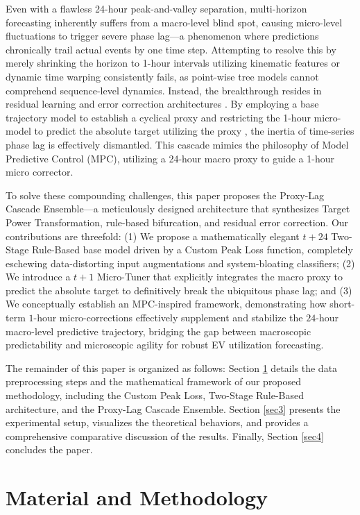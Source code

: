 \documentclass[pdflatex,sn-mathphys-num]{sn-jnl}%
\theoremstyle{thmstyleone}%
\theoremstyle{thmstyletwo}%
\theoremstyle{thmstylethree}%
\begin{document}
Even with a flawless 24-hour peak-and-valley separation, multi-horizon forecasting inherently suffers from a macro-level blind spot, causing micro-level fluctuations to trigger severe phase lag---a phenomenon where predictions chronically trail actual events by one time step. Attempting to resolve this by merely shrinking the horizon to 1-hour intervals utilizing kinematic features or dynamic time warping consistently fails, as point-wise tree models cannot comprehend sequence-level dynamics. Instead, the breakthrough resides in residual learning and error correction architectures \cite{kong2020short, shen2020novel}. By employing a base trajectory model to establish a cyclical proxy and restricting the 1-hour micro-model to predict the absolute target utilizing the proxy \cite{zhang2021novel}, the inertia of time-series phase lag is effectively dismantled. This cascade mimics the philosophy of Model Predictive Control (MPC), utilizing a 24-hour macro proxy to guide a 1-hour micro corrector.

To solve these compounding challenges, this paper proposes the Proxy-Lag Cascade Ensemble---a meticulously designed architecture that synthesizes Target Power Transformation, rule-based bifurcation, and residual error correction. Our contributions are threefold: (1) We propose a mathematically elegant $t+24$ Two-Stage Rule-Based base model driven by a Custom Peak Loss function, completely eschewing data-distorting input augmentations and system-bloating classifiers; (2) We introduce a $t+1$ Micro-Tuner that explicitly integrates the macro proxy to predict the absolute target to definitively break the ubiquitous phase lag; and (3) We conceptually establish an MPC-inspired framework, demonstrating how short-term $1$-hour micro-corrections effectively supplement and stabilize the $24$-hour macro-level predictive trajectory, bridging the gap between macroscopic predictability and microscopic agility for robust EV utilization forecasting.

The remainder of this paper is organized as follows: Section \ref{sec2} details the data preprocessing steps and the mathematical framework of our proposed methodology, including the Custom Peak Loss, Two-Stage Rule-Based architecture, and the Proxy-Lag Cascade Ensemble. Section \ref{sec3} presents the experimental setup, visualizes the theoretical behaviors, and provides a comprehensive comparative discussion of the results. Finally, Section \ref{sec4} concludes the paper.

\section{Material and Methodology}\label{sec2}
\end{document}
